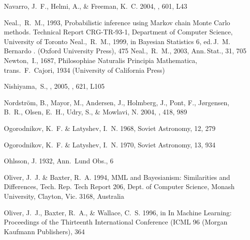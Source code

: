 \begin{thebibliography}{99}
{Navarro}, J.~F., {Helmi}, A., \& {Freeman}, K.~C. 2004, \apjl, 601, L43

  Neal.,~R.~M., 1993,
  Probabilistic inference using {M}arkov chain {M}onte {C}arlo methods.
  Technical Report CRG-TR-93-1, Department of Computer Science,
  University of Toronto
  Neal.,~R.~M., 1999,
  in Bayesian Statistics 6,
  ed.\,J.~M. Bernardo \etal. (Oxford University Press), 475
  Neal.,~R.~M., 2003,
  Ann.\,Stat., 31, 705
  Newton,~I., 1687,
  Philosophiae Naturalis Principia Mathematica,
  trans.\ F.~Cajori, 1934
  (University of California Press)

  Nishiyama,~S., \etal, 2005, \apjl, 621, L105

{Nordstr{\"o}m}, B., {Mayor}, M., {Andersen}, J., {Holmberg}, J., {Pont}, F.,
  {J{\o}rgensen}, B.~R., {Olsen}, E.~H., {Udry}, S., \& {Mowlavi}, N. 2004,
  \aap, 418, 989

{Ogorodnikov}, K.~F. \& {Latyshev}, I.~N. 1968, Soviet Astronomy, 12, 279

{Ogorodnikov}, K.~F. \& {Latyshev}, I.~N. 1970, Soviet Astronomy, 13, 934

{Ohlsson}, J. 1932, Ann.~Lund Obs., 6

{Oliver}, J.~J. \& {Baxter}, R.~A. 1994, {MML and Bayesianism: Similarities and
  Differences}, Tech. Rep. Tech Report 206, Dept. of Computer Science, Monash
  University, Clayton, Vic. 3168, Australia

{Oliver}, J.~J., {Baxter}, R.~A., \& {Wallace}, C.~S. 1996, in In Machine
  Learning: Proceedings of the Thirteenth International Conference (ICML 96
  (Morgan Kaufmann Publishers), 364


\end{thebibliography}
